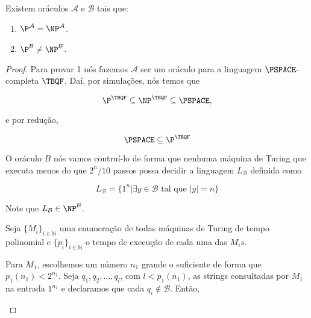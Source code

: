 \begin{teo} \label{teo: bgs}

Existem oráculos $\mathcal{A}$ e $\mathcal{B}$ tais que:

\begin{enumerate}

\item $\P^{\mathcal{A}} = \NP^{\mathcal{A}}$.

\item $\P^{\mathcal{B}} \neq \NP^{\mathcal{B}}$.

\end{enumerate}

\end{teo}

\begin{proof}

Para provar 1 nós fazemos $\mathcal{A}$ ser um oráculo para a linguagem $\PSPACE$-completa $\TBQF$. Daí, por simulações, nós temos que

\begin{equation*}
	\P^{\TBQF} \subseteq \NP^{\TBQF} \subseteq \PSPACE,
\end{equation*}

e por redução,

\begin{equation*}
	\PSPACE \subseteq \P^{\TBQF}
\end{equation*}

O oráculo $B$ nós vamos contruí-lo de forma que nenhuma máquina de Turing que executa menos do que $2^{n}/10$ passos possa decidir a linguagem $L_{\mathcal{B}}$ definida como

\begin{equation*}
    L_{\mathcal{B}} = \{1^{n} \lvert \exists y \in \mathcal{B} \text{ tal que } \lvert y \rvert = n \}
\end{equation*}

Note que $L_{\mathcal{B}} \in \NP^{\mathcal{B}}$.

Seja $\{M_{i}\}_{i \in \mathbb{N}}$ uma enumeração de todas máquinas de Turing de tempo polinomial e $\{p_{i}\}_{i \in \mathbb{N}}$ o tempo de execução de cada uma das $M_{i}s$.

Para $M_{1}$, escolhemos um número $n_{1}$ grande o suficiente de forma que $p_{1}(n_{1}) < 2^{n_{1}}$. Seja $q_{1}, q_{2}, \dots, q_{l}$, com $l < p_{1}(n_{1})$, as strings consultadas por $M_{1}$ na entrada $1^{n_{1}}$ e declaramos que cada $q_{i} \not\in \mathcal{B}$. Então,

\begin{itemize}


\end{itemize}
\end{proof}
